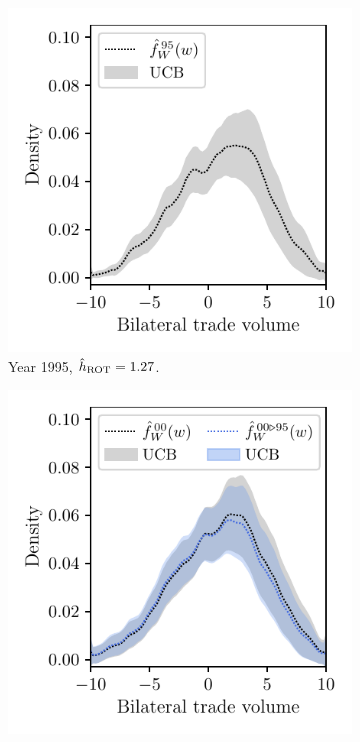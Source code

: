 \begin{figure}[ht]
  \centering
  \begin{subfigure}{0.32\textwidth}
    \centering
    \includegraphics[scale=0.64]{graphics/trade_plot_parametric_1995.pdf}
    \caption{Year 1995, $\hat h_{\operatorname{ROT}} = 1.27$.}
  \end{subfigure}
  \begin{subfigure}{0.32\textwidth}
    \centering
    \includegraphics[scale=0.64]{graphics/trade_plot_parametric_1995_2000.pdf}

\end{subfigure}
\end{figure}
